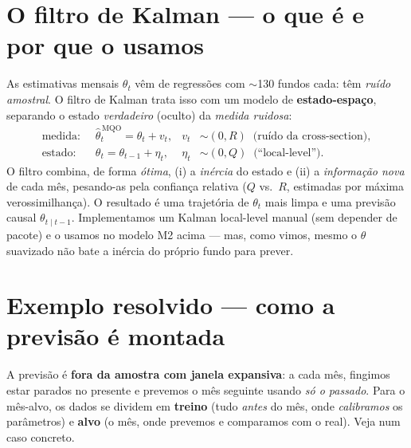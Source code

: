 \documentclass[11pt]{article}
\begin{document}
\section{O filtro de Kalman --- o que é e por que o usamos}

As estimativas mensais $\theta_t$ vêm de regressões com $\sim$130 fundos cada: têm
\emph{ruído amostral}. O filtro de Kalman trata isso com um modelo de
\textbf{estado-espaço}, separando o estado \emph{verdadeiro} (oculto) da \emph{medida
ruidosa}:
\begin{align}
\text{medida:}\;\; & \widehat{\theta}^{\,\text{MQO}}_{t}=\theta_t+v_t,
   & v_t&\sim(0,R)\;\;\text{(ruído da cross-section)},\\
\text{estado:}\;\; & \theta_t=\theta_{t-1}+\eta_t,
   & \eta_t&\sim(0,Q)\;\;\text{(``local-level'')}.
\end{align}
O filtro combina, de forma \emph{ótima}, (i) a \emph{inércia} do estado e (ii) a
\emph{informação nova} de cada mês, pesando-as pela confiança relativa ($Q$ vs.\ $R$,
estimadas por máxima verossimilhança). O resultado é uma trajetória de $\theta_t$ mais
limpa e uma previsão causal $\theta_{t\mid t-1}$. Implementamos um Kalman local-level
manual (sem depender de pacote) e o usamos no modelo M2 acima --- mas, como vimos, mesmo
o $\theta$ suavizado não bate a inércia do próprio fundo para prever.

\section{Exemplo resolvido --- como a previsão é montada}

A previsão é \textbf{fora da amostra com janela expansiva}: a cada mês, fingimos estar
parados no presente e prevemos o mês seguinte usando \emph{só o passado}. Para o
mês-alvo, os dados se dividem em \textbf{treino} (tudo \emph{antes} do mês, onde
\emph{calibramos} os parâmetros) e \textbf{alvo} (o mês, onde prevemos e comparamos com
o real). Veja num caso concreto.
\end{document}
